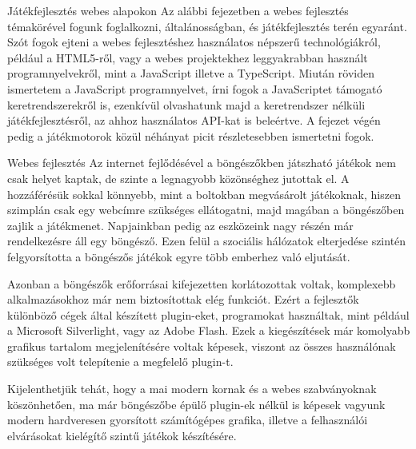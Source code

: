 \begin{MyChapter}{Játékfejlesztés webes alapokon}	
	Az alábbi fejezetben a webes fejlesztés témakörével fogunk foglalkozni, általánosságban, és játékfejlesztés terén egyaránt. Szót fogok ejteni a webes fejlesztéshez használatos népszerű technológiákról, például a HTML5-ről, vagy a webes projektekhez leggyakrabban használt programnyelvekről, mint a JavaScript illetve a TypeScript.
	Miután röviden ismertetem a JavaScript programnyelvet, írni fogok a JavaScriptet támogató keretrendszerekről is, ezenkívül olvashatunk majd a keretrendszer nélküli játékfejlesztésről, az ahhoz használatos API-kat is beleértve. A fejezet végén pedig a játékmotorok közül néhányat picit részletesebben ismertetni fogok.

	\begin{MySection}{Webes fejlesztés}
		Az internet fejlődésével a böngészőkben játszható játékok nem csak helyet kaptak, de szinte a legnagyobb közönséghez jutottak el. A hozzáférésük sokkal könnyebb, mint a boltokban megvásárolt játékoknak, hiszen szimplán csak egy webcímre szükséges ellátogatni, majd magában a böngészőben zajlik a játékmenet. Napjainkban pedig az eszközeink nagy részén már rendelkezésre áll egy böngésző. Ezen felül a szociális hálózatok elterjedése szintén felgyorsította a böngészős játékok egyre több emberhez való eljutását.
		\cite{browser_games}
		\cite{html5_games}
		
		Azonban a böngészők erőforrásai kifejezetten korlátozottak voltak, komplexebb alkalmazásokhoz már nem biztosítottak elég funkciót. Ezért a fejlesztők különböző cégek által készített plugin-eket, programokat használtak, mint például a Microsoft Silverlight, vagy az Adobe Flash. Ezek a kiegészítések már komolyabb grafikus tartalom megjelenítésére voltak képesek, viszont az összes használónak szükséges volt telepítenie a megfelelő plugin-t. 
		
		Kijelenthetjük tehát, hogy a mai modern kornak és a webes szabványoknak köszönhetően, ma már böngészőbe épülő plugin-ek nélkül is képesek vagyunk modern hardveresen gyorsított számítógépes grafika, illetve a felhasználói elvárásokat kielégítő szintű játékok készítésére.
	\end{MySection}


\end{MyChapter}

